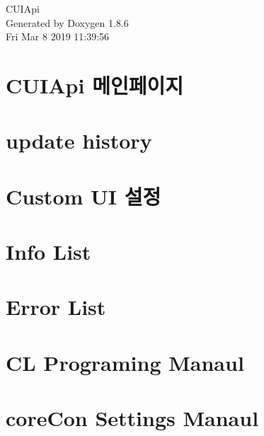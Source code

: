 \documentclass[twoside]{book}
\newcommand{\clearemptydoublepage}{%
  \newpage{\pagestyle{empty}\cleardoublepage}%
}
\begin{document}
\hypersetup{pageanchor=false}
\begin{titlepage}
\vspace*{7cm}
\begin{center}%
{\Large C\-U\-I\-Api }\\
\vspace*{1cm}
{\large Generated by Doxygen 1.8.6}\\
\vspace*{0.5cm}
{\small Fri Mar 8 2019 11:39:56}\\
\end{center}
\end{titlepage}
\clearemptydoublepage
\tableofcontents
\clearemptydoublepage
{}
\hypersetup{pageanchor=true}

\chapter{C\-U\-I\-Api 메인페이지}
\label{index}\hypertarget{index}{}
\chapter{update history}
\label{md_CuiHistory}
\hypertarget{md_CuiHistory}{}

\chapter{Custom U\-I 설정}
\label{md_CustomDoc}
\hypertarget{md_CustomDoc}{}

\chapter{Info List}
\label{Info_List}
\hypertarget{Info_List}{}

\chapter{Error List}
\label{Error_List}
\hypertarget{Error_List}{}

\chapter{C\-L Programing Manaul}
\label{md__home_kimdj_project_coreDoc_doc_cl_program}
\hypertarget{md__home_kimdj_project_coreDoc_doc_cl_program}{}

\chapter{core\-Con Settings Manaul}
\label{md__home_kimdj_project_coreDoc_doc_corecon_settings}
\hypertarget{md__home_kimdj_project_coreDoc_doc_corecon_settings}{}

\end{document}
